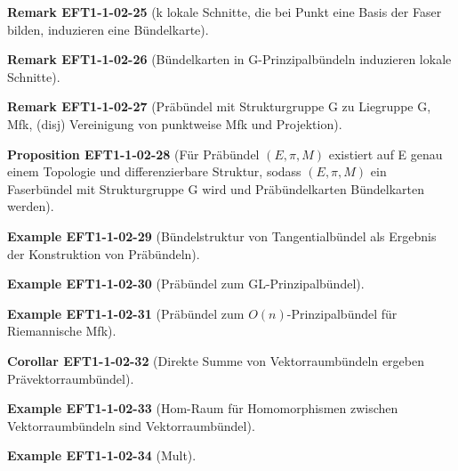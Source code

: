 \documentclass[10pt, letterpaper]{article}
\newcommand{\CustomHeading}[3]{%
  \par\medskip\noindent%
  \textbf{#1 #2} \textnormal{(#3)}.\enskip%
}
\newenvironment{PROP}[2]{\CustomHeading{Proposition}{#1}{#2}}{}
\newenvironment{KORO}[2]{\CustomHeading{Corollar}{#1}{#2}}{}
\newenvironment{REM}[2]{\CustomHeading{Remark}{#1}{#2}}{}
\newenvironment{EXA}[2]{\CustomHeading{Example}{#1}{#2}}{}
\begin{document}
\begin{REM}{EFT1-1-02-25}{k lokale Schnitte, die bei Punkt eine Basis der Faser bilden, induzieren eine Bündelkarte}
\end{REM}

\begin{REM}{EFT1-1-02-26}{Bündelkarten in G-Prinzipalbündeln induzieren lokale Schnitte}
\end{REM}

\begin{REM}{EFT1-1-02-27}{Präbündel mit Strukturgruppe G zu Liegruppe G, Mfk, (disj) Vereinigung von punktweise Mfk und Projektion}
\end{REM}

\begin{PROP}{EFT1-1-02-28}{Für Präbündel $(E,\pi,M)$ existiert auf E genau einem Topologie und differenzierbare Struktur, sodass $(E,\pi,M)$ ein Faserbündel mit Strukturgruppe G wird und Präbündelkarten Bündelkarten werden}
\end{PROP}

\begin{EXA}{EFT1-1-02-29}{Bündelstruktur von Tangentialbündel als Ergebnis der Konstruktion von Präbündeln}
\end{EXA}

\begin{EXA}{EFT1-1-02-30}{Präbündel zum GL-Prinzipalbündel}
\end{EXA}

\begin{EXA}{EFT1-1-02-31}{Präbündel zum $O(n)$-Prinzipalbündel für Riemannische Mfk}
\end{EXA}

\begin{KORO}{EFT1-1-02-32}{Direkte Summe von Vektorraumbündeln ergeben Prävektorraumbündel}
\end{KORO}

\begin{EXA}{EFT1-1-02-33}{Hom-Raum für Homomorphismen zwischen Vektorraumbündeln sind Vektorraumbündel}
\end{EXA}

\begin{EXA}{EFT1-1-02-34}{Mult}
\end{EXA}
\end{document}
